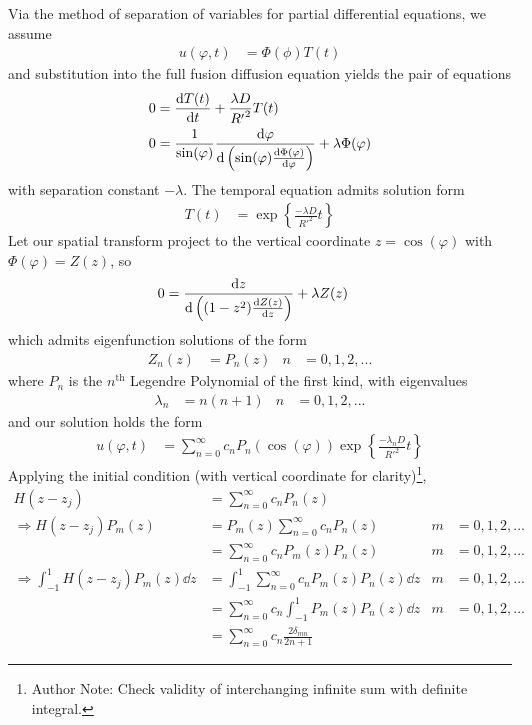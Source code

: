 \documentclass{report}
\newcommand\Par[1]{{ \left({#1}\right) }}
\newcommand\Brace[1]{{ \left\{{#1}\right\} }}
\newcommand\R{{ R' }}
\begin{document}
Via the method of separation of variables for partial differential equations, we assume
\begin{align*}
	u(\varphi, t) &= \Phi(\phi) T(t)
\end{align*}
and substitution into the full fusion diffusion equation yields the pair of equations
\begin{align*}
	0 &= \dv{T(t)}{t} + \frac{\lambda D}{\R^2} T(t) \\
	0 &= \frac{1}{\sin(\varphi)} \dv{\varphi}\Par{\sin(\varphi) \dv{\Phi(\varphi)}{\varphi}} + \lambda \Phi(\varphi)
\end{align*}
with separation constant $-\lambda$. The temporal equation admits solution form
\begin{align*}
	T(t) &= \exp\Brace{\frac{-\lambda D}{\R^2} t}
\end{align*}
Let our spatial transform project to the vertical coordinate $z = \cos(\varphi)$ with $\Phi(\varphi) = Z(z)$, so
\begin{align*}
	0 &= \dv{z}\Par{\Par{1 - z^2} \dv{Z(z)}{z}} + \lambda Z(z)
\end{align*}
which admits eigenfunction solutions of the form
\begin{align*}
	Z_n(z) &= P_n(z) & n &= 0, 1, 2, ...
\end{align*}
where $P_n$ is the $n^\text{th}$ Legendre Polynomial of the first kind, with eigenvalues
\begin{align*}
	\lambda_n &= n \Par{n + 1} & n &= 0, 1, 2, ...
\end{align*}
and our solution holds the form
\begin{align*}
	u(\varphi, t) &= \sum_{n = 0}^\infty c_n P_n\Par{\cos(\varphi)} \exp\Brace{\frac{-\lambda_n D}{\R^2} t}
\end{align*}
Applying the initial condition (with vertical coordinate for clarity)\footnote{Author Note: Check validity of interchanging infinite sum with definite integral.},
\begin{align*}
	H(z - z_j) &= \sum_{n = 0}^\infty c_n P_n(z) \\
	\Rightarrow H(z - z_j) P_m(z) &= P_m(z) \sum_{n = 0}^\infty c_n P_n(z) & m &= 0, 1, 2, ... \\
	&= \sum_{n = 0}^\infty c_n P_m(z) P_n(z) & m &= 0, 1, 2, ... \\
	\Rightarrow \int_{-1}^1 H(z - z_j) P_m(z) \dd{z} &= \int_{-1}^1 \sum_{n = 0}^\infty c_n P_m(z) P_n(z) \dd{z} & m &= 0, 1, 2, ... \\
	&= \sum_{n=0}^\infty c_n \int_{-1}^1 P_m(z) P_n(z) \dd{z} & m &= 0, 1, 2, ... \\
	&= \sum_{n=0}^\infty c_n \frac{2 \delta_{mn}}{2n + 1}
\end{align*}
\end{document}
